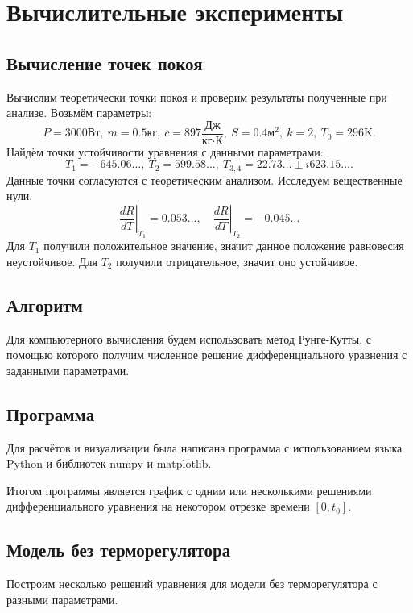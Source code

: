 \section{Вычислительные эксперименты}
    \subsection{Вычисление точек покоя}
        Вычислим теоретически точки покоя и проверим результаты полученные при анализе. Возьмём параметры:
        \[
            P = 3000 \text{Вт}, ~ m = 0.5 \text{кг}, ~ c = 897 \frac{\text{Дж}}{\text{кг} \cdot \text{К}}, ~ S = 0.4 \text{м}^2, ~ k = 2, ~ T_0 = 296 \text{K}.
        \]
        Найдём точки устойчивости уравнения с данными параметрами:
        \[
            T_1 = -645.06\dots, ~
            T_2 = 599.58\dots, ~
            T_{3,4} = 22.73\dots \pm i 623.15\dots.
        \]
        Данные точки согласуются с теоретическим анализом.
        Исследуем вещественные нули.
        \[
            \left.\frac{dR}{dT}\right|_{T_1} = 0.053\dots, \quad
            \left.\frac{dR}{dT}\right|_{T_2} = -0.045\dots
        \]
        Для $T_1$ получили положительное значение, значит данное положение равновесия неустойчивое. Для $T_2$ получили отрицательное, значит оно устойчивое.

    \subsection{Алгоритм}
        Для компьютерного вычисления будем использовать метод Рунге-Кутты, с помощью которого получим численное решение дифференциального уравнения с заданными параметрами.

    \subsection{Программа}
        Для расчётов и визуализации была написана программа с использованием языка Python и библиотек numpy и matplotlib.

        

        Итогом программы является график с одним или несколькими решениями дифференциального уравнения на некотором отрезке времени $ [0, t_0] $.

    \subsection{Модель без терморегулятора}
        Построим несколько решений уравнения для модели без терморегулятора с разными параметрами.

